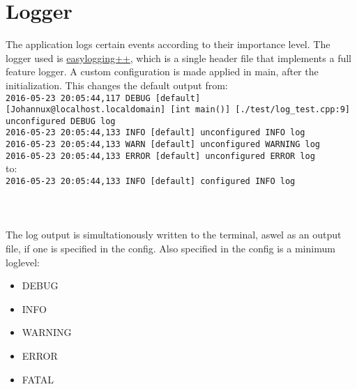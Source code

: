 

\section{Logger}
\label{sec:client_logger}

The application logs certain events according to their importance level.
The logger used is \href{https://github.com/easylogging/easyloggingpp/}{easylogging++}, which is a single header file that implements a full feature logger.
A custom configuration is made applied in main, after the initialization. This changes the default output from:\\
\texttt{2016-05-23 20:05:44,117 DEBUG [default] [Johannux@localhost.localdomain] [int main()] [./test/log\_test.cpp:9] unconfigured DEBUG log}\\
\texttt{2016-05-23 20:05:44,133 INFO  [default] unconfigured INFO log}\\
\texttt{2016-05-23 20:05:44,133 WARN  [default] unconfigured WARNING log}\\
\texttt{2016-05-23 20:05:44,133 ERROR [default] unconfigured ERROR log}\\
to:\\
\texttt{2016-05-23 20:05:44,133 INFO  [default] configured INFO log}\\
\texttt{\color{orange}{2016-05-23 20:05:44,133 WARN  [default] configured WARNING log}}\\
\texttt{\color{red}{2016-05-23 20:05:44,133 ERROR [default] configured ERROR log}}\\
\texttt{\color{red}{2016-05-23 20:05:44,133 FATAL [default] configured FATAL log}}\\
The log output is simultationously written to the terminal, aswel as an output file, if one is specified in the config. Also specified in the config is a minimum loglevel:
\small{
\begin{itemize} [noitemsep, nolistsep]
	\item DEBUG
	\item INFO
	\item WARNING
	\item ERROR
	\item FATAL
\end{itemize}
}
